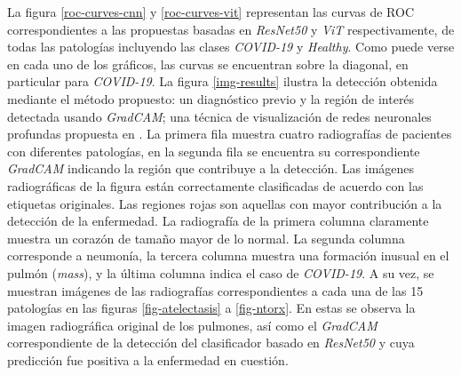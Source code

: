 La figura \ref{roc-curves-cnn} y \ref{roc-curves-vit} representan las curvas de ROC correspondientes
a las propuestas basadas en \textit{ResNet50} y \textit{ViT} respectivamente, de todas las patologías
incluyendo las clases \textit{COVID-19} y \textit{Healthy}. Como puede verse en cada uno de los
gráficos, las curvas se encuentran sobre la diagonal, en particular para \textit{COVID-19}. La figura
\ref{img-results} ilustra la detección obtenida mediante el método propuesto: un diagnóstico previo
y la región de interés detectada usando \textit{GradCAM}; una técnica de visualización de redes neuronales
profundas propuesta en \cite{selvaraju2017grad}. La primera fila muestra cuatro radiografías de
pacientes con diferentes patologías, en la segunda fila se encuentra su correspondiente \textit{GradCAM}
indicando la región que contribuye a la detección. Las imágenes radiográficas de la figura están
correctamente clasificadas de acuerdo con las etiquetas originales. Las regiones rojas son aquellas
con mayor contribución a la detección de la enfermedad. La radiografía de la primera columna claramente
muestra un corazón de tamaño mayor de lo normal. La segunda columna corresponde a neumonía, la
tercera columna muestra una formación inusual en el pulmón (\textit{mass}), y la última columna indica
el caso de \textit{COVID-19}. A su vez, se muestran imágenes de las radiografías correspondientes a cada
una de las 15 patologías en las figuras \ref{fig-atelectasis} a \ref{fig-ntorx}. En estas se observa
la imagen radiográfica original de los pulmones, así como el \textit{GradCAM} correspondiente de la
detección del clasificador basado en \textit{ResNet50} y cuya predicción fue positiva a la enfermedad
en cuestión.


